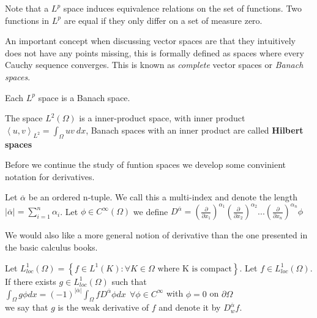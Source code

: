 \documentclass[../Main/main.tex]{subfiles}
\begin{document}
	\begin{remark}
		Note that a $L^p$ space induces equivalence relations on the set of functions. Two functions in $L^p$ are equal if they only differ on a set of measure zero.
	\end{remark}
	An important concept when discussing vector spaces are that they intuitively does not have any points missing, this is formally defined as spaces where every Cauchy sequence converges. This is known as \emph{complete} vector spaces or \emph{Banach spaces}.
	
	\begin{theorem}\label{theorem:Riesz-Fischer}
		Each $L^p$ space is a Banach space.
	\end{theorem}
	\begin{remark}
		The space $L^2(\Omega)$ is a inner-product space, with inner product $\left \langle u,v\right \rangle_{L^2} = \int_{\Omega}uv \ dx$, Banach spaces with an inner product are called \textbf{Hilbert spaces}
	\end{remark}
	
	
	
	
	Before we continue the study of funtion spaces we develop some convinient notation for derivatives.
	
	\begin{definition}
		Let $\overline{\alpha}$ be an ordered n-tuple. We call this a multi-index and denote the length $|\overline{\alpha}| = \sum_{i=1}^n 		\alpha_i$.
		Let $\phi \in C^{\infty}(\Omega)$ we define $D^{\overline{\alpha}} = (\frac{\partial }{\partial x_1})^{\alpha_1}(\frac{\partial }{\partial x_2})^{\alpha_2}...(\frac{\partial }{\partial x_n})^{\alpha_n}\phi$
	\end{definition}
	
	We would also like a more general notion of derivative than the one presented in the basic calculus books.
	\begin{definition}
		Let $L_{loc}^1(\Omega) =\left \{  \right. f\in L^1(K):\forall K \in \Omega \text{  where K is compact}\left.  \right \}$.
		Let $f \in L_{loc}^1(\Omega)$. If there exists $g\in L_{loc}^1 (\Omega)$ such that \\
		$\int_{\Omega} g \phi dx = (-1)^{|\overline{\alpha}|} \int_{\Omega} f D^{\overline{\alpha}} \phi dx \ \ \forall \phi \in C^{\infty}$ with $\phi = 0$ on $\partial \Omega$ \\ we say that $g$ is the weak derivative of $f$ and denote it by $D_w^{\overline{\alpha}}f$.
	\end{definition}
	
\end{document}
